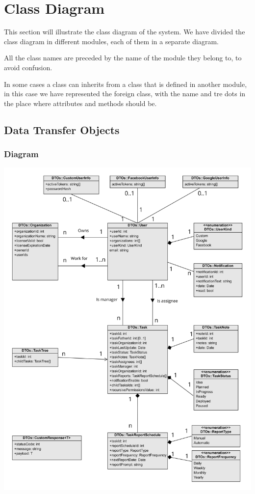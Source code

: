 \documentclass{article}
\begin{document}
\section{Class Diagram}

This section will illustrate the class diagram of the system.
We have divided the class diagram in different modules, each of them in a separate diagram.

All the class names are preceded by the name of the module they belong to, to avoid confusion.

In some cases a class can inherits from a class that is defined in another module, in this case
we have represented the foreign class, with the name and tre dots in the place where attributes and methods should be.

\subsection{Data Transfer Objects}

\subsubsection{Diagram}

\includegraphics[width=\textwidth,height=\textheight,keepaspectratio]{images/class_diagram/data_transfert_objects.jpg}
\end{document}
